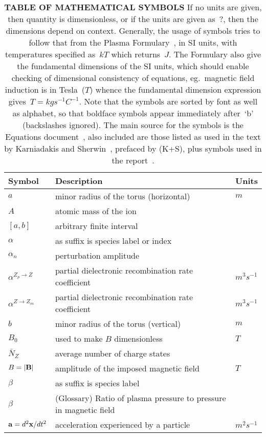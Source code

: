 \begin{longtable}{|p{3.0cm}|p{10.0cm}|p{3.0cm}|}
\caption{\textbf{\textsf{TABLE OF MATHEMATICAL SYMBOLS}}
If no units are given, then quantity is dimensionless, or if the units are given as~$?$,
then the dimensions depend on context.
Generally, the usage of symbols tries to follow that from the Plasma Formulary~\cite{NRLpf07},
in SI units, with temperatures specified as~$kT$ which returns~$J$. The Formulary also
give the fundamental dimensions of the SI units, which should enable checking of dimensional consistency of
equations, eg.\ magnetic field induction is in Tesla~($T$) whence the fundamental
dimension expression gives~$T=kg s^{-1} C^{-1}$.
Note that the symbols are sorted by font as well as alphabet, so that boldface symbols
appear immediately after~`b' (backslashes ignored). The main source for the symbols is
the Equations document~\cite{pappeqs}, also included are those listed as used in the text by
Karniadakis and Sherwin~\cite{karniadakissherwin}, prefaced by (K+S), plus symbols used in the
report~\cite{y2re313}. \label{tab:symbols}
} \\
\hline
\textbf{\textsf{Symbol}} & \textbf{\textsf{Description}}  & \textbf{\textsf{Units}} \\
\hline
$a$ & minor radius of the torus (horizontal) & $m$ \\
$A$ & atomic mass of the ion &  \\
$[a,b]$ & arbitrary finite interval  & \\
$\alpha$ & as suffix is species label or index &  \\
$\alpha_n$ & perturbation amplitude &  \\
$\alpha^{Z_p\rightarrow Z}$ & partial dielectronic recombination rate coefficient  & $m^3 s^{-1}$  \\
$\alpha^{Z\rightarrow Z_m}$ & partial dielectronic recombination rate coefficient  & $m^3 s^{-1}$  \\
$b$ & minor radius of the torus (vertical) & $m$ \\
$B_0$ & used to make $B$ dimensionless  &  $T$  \\
$\bar{N}_Z$ & average number of charge states  &   \\
$B=|{\bf B}|$ & amplitude of the imposed magnetic field  &  $T$  \\
$\beta$ & as suffix is species label & \\
$\beta$ & (Glossary) Ratio of plasma pressure to pressure in magnetic field &  \\
${\bf a} = d^2 {\bf x}/dt^2$ & acceleration experienced by a particle  &  $m^2 s^{-1}$ \\

\end{longtable}

